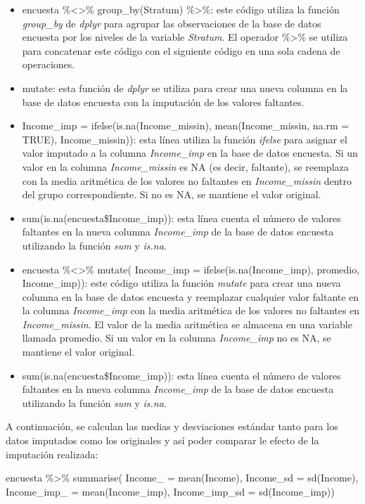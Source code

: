 \documentclass[
  12pt,
]{book}
\newenvironment{Shaded}{\begin{snugshade}}{\end{snugshade}}
\newcommand{\AttributeTok}[1]{\textcolor[rgb]{0.77,0.63,0.00}{#1}}
\newcommand{\FunctionTok}[1]{\textcolor[rgb]{0.00,0.00,0.00}{#1}}
\newcommand{\NormalTok}[1]{#1}
\newcommand{\SpecialCharTok}[1]{\textcolor[rgb]{0.00,0.00,0.00}{#1}}
\begin{document}
\begin{itemize}
\item
  encuesta \%\textless\textgreater\% group\_by(Stratum) \%\textgreater\%: este código utiliza la función \emph{group\_by} de \emph{dplyr} para agrupar las observaciones de la base de datos encuesta por los niveles de la variable \emph{Stratum}. El operador \%\textgreater\% se utiliza para concatenar este código con el siguiente código en una sola cadena de operaciones.
\item
  mutate: esta función de \emph{dplyr} se utiliza para crear una nueva columna en la base de datos encuesta con la imputación de los valores faltantes.
\item
  Income\_imp = ifelse(is.na(Income\_missin), mean(Income\_missin, na.rm = TRUE), Income\_missin)): esta línea utiliza la función \emph{ifelse} para asignar el valor imputado a la columna \emph{Income\_imp} en la base de datos encuesta. Si un valor en la columna \emph{Income\_missin} es NA (es decir, faltante), se reemplaza con la media aritmética de los valores no faltantes en \emph{Income\_missin} dentro del grupo correspondiente. Si no es NA, se mantiene el valor original.
\item
  sum(is.na(encuesta\$Income\_imp)): esta línea cuenta el número de valores faltantes en la nueva columna \emph{Income\_imp} de la base de datos encuesta utilizando la función \emph{sum} y \emph{is.na}.
\item
  encuesta \%\textless\textgreater\% mutate( Income\_imp = ifelse(is.na(Income\_imp), promedio, Income\_imp)): este código utiliza la función \emph{mutate} para crear una nueva columna en la base de datos encuesta y reemplazar cualquier valor faltante en la columna \emph{Income\_imp} con la media aritmética de los valores no faltantes en \emph{Income\_missin}. El valor de la media aritmética se almacena en una variable llamada promedio. Si un valor en la columna \emph{Income\_imp} no es NA, se mantiene el valor original.
\item
  sum(is.na(encuesta\$Income\_imp)): esta línea cuenta el número de valores faltantes en la nueva columna \emph{Income\_imp} de la base de datos encuesta utilizando la función \emph{sum} y \emph{is.na}.
\end{itemize}

A continuación, se calculan las medias y desviaciones estándar tanto para los datos imputados como los originales y así poder comparar le efecto de la imputación realizada:

\begin{Shaded}
\begin{Highlighting}[]
\NormalTok{encuesta }\SpecialCharTok{\%\textgreater{}\%} \FunctionTok{summarise}\NormalTok{(}
  \AttributeTok{Income\_ =} \FunctionTok{mean}\NormalTok{(Income),}
  \AttributeTok{Income\_sd =} \FunctionTok{sd}\NormalTok{(Income),}
  \AttributeTok{Income\_imp\_ =} \FunctionTok{mean}\NormalTok{(Income\_imp),}
  \AttributeTok{Income\_imp\_sd =} \FunctionTok{sd}\NormalTok{(Income\_imp))}
\end{Highlighting}
\end{Shaded}
\end{document}
